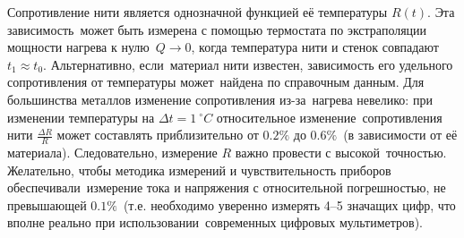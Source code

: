 \documentclass[a4paper, 12pt]{article}
\begin{document}
Сопротивление нити является однозначной функцией её температуры $R(t)$. Эта зависимость\
может быть измерена с помощью термостата по экстраполяции мощности нагрева к нулю\
$Q \rightarrow 0$, когда температура нити и стенок совпадают $t_1 \approx t_0$. Альтернативно, если\
материал нити известен, зависимость его удельного сопротивления от температуры может\
найдена по справочным данным. Для большинства металлов изменение сопротивления из-за\
нагрева невелико: при изменении температуры на $\Delta t = 1\ ^\circ C$ относительное изменение\
сопротивления нити $\frac{\Delta R}{R}$ может составлять приблизительно от $0.2\%$ до $0.6\%$\
(в зависимости от её материала). Следовательно, измерение $R$ важно провести с высокой\
точностью. Желательно, чтобы методика измерений и чувствительность приборов обеспечивали\
измерение тока и напряжения с относительной погрешностью, не превышающей $0.1\%$\
(т.е. необходимо уверенно измерять 4–5 значащих цифр, что вполне реально при использовании\
современных цифровых мультиметров).
\end{document}
